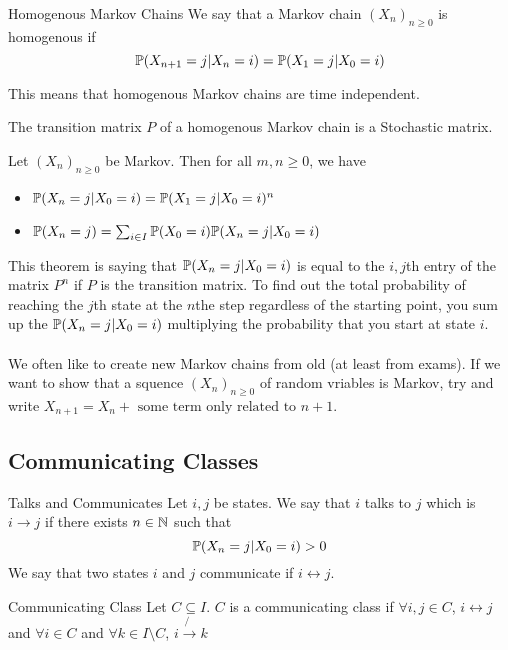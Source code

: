\documentclass[a4paper]{article}
\begin{document}
\begin{defn}{Homogenous Markov Chains}{} We say that a Markov chain $(X_n)_{n\geq 0}$ is homogenous if $$\mathbb{P}(X_{n+1}=j|X_n=i)=\mathbb{P}(X_1=j|X_0=i)$$
\end{defn}

This means that homogenous Markov chains are time independent. 

\begin{lmm}{}{} The transition matrix $P$ of a homogenous Markov chain is a Stochastic matrix. 
\end{lmm}

\begin{thm}{}{} Let $(X_n)_{n\geq 0}$ be Markov. Then for all $m,n\geq0$, we have
\begin{itemize}
\item $\mathbb{P}(X_n=j|X_0=i)=\mathbb{P}(X_1=j|X_0=i)^n$
\item $\mathbb{P}(X_n=j)=\sum_{i\in I}\mathbb{P}(X_0=i)\mathbb{P}(X_n=j|X_0=i)$
\end{itemize}
\end{thm}

This theorem is saying that $\mathbb{P}(X_n=j|X_0=i)$ is equal to the $i,j$th entry of the matrix $P^n$ if $P$ is the transition matrix. To find out the total probability of reaching the $j$th state at the $n$the step regardless of the starting point, you sum up the $\mathbb{P}(X_n=j|X_0=i)$ multiplying the probability that you start at state $i$. \\~\\

We often like to create new Markov chains from old (at least from exams). If we want to show that a squence $(X_n)_{n\geq 0}$ of random vriables is Markov, try and write $X_{n+1}=X_n+\text{ some term only related to }n+1$. 

\subsection{Communicating Classes}
\begin{defn}{Talks and Communicates}{} Let $i,j$ be states. We say that $i$ talks to $j$ which is $i\rightarrow j$ if there exists $n\in\mathbb{N}$ such that $$\mathbb{P}(X_n=j|X_0=i)>0$$ We say that two states $i$ and $j$ communicate if $i\leftrightarrow j$. 
\end{defn}

\begin{defn}{Communicating Class}{} Let $C\subseteq I$. $C$ is a communicating class if $\forall i,j\in C$, $i\leftrightarrow j$ and $\forall i\in C$ and $\forall k\in I\setminus C$, $i\not{\rightarrow} k$ 
\end{defn}
\end{document}
